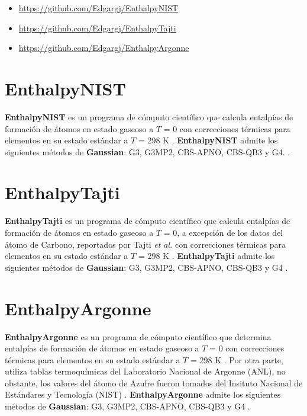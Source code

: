 \begin{itemize}

	\item \url{https://github.com/Edgargj/EnthalpyNIST}\\
	\item \url{https://github.com/Edgargj/EnthalpyTajti}\\
	\item \url{https://github.com/Edgargj/EnthalpyArgonne}\\

\end{itemize}

\newpage

\section{EnthalpyNIST}

\textbf{EnthalpyNIST} es un programa de cómputo científico que calcula entalpías de formación de átomos en estado gaseoso a  $T$ = 0 con correcciones térmicas para elementos en su estado estándar a $T$ = 298 K \cite{NIST1998,Nicolaides1996,McQuarrie1976}. \textbf{EnthalpyNIST} admite los siguientes métodos de \textbf{Gaussian}: G3, G3MP2, CBS-APNO, CBS-QB3 y G4. \cite{Simmie2015}.

\section{EnthalpyTajti}

\textbf{EnthalpyTajti} es un programa de cómputo científico que calcula entalpías de formación de átomos en estado gaseoso a  $T$ = 0, a excepción de los datos del átomo de Carbono, reportados por Tajti \textit{et al.} \cite{Tajti2004} con correcciones térmicas para elementos en su estado estándar a $T$ = 298 K \cite{NIST1998,Nicolaides1996,McQuarrie1976}. \textbf{EnthalpyTajti} admite los siguientes métodos de \textbf{Gaussian}: G3, G3MP2, CBS-APNO, CBS-QB3 y G4 \cite{Simmie2015}.

\section{EnthalpyArgonne}

\textbf{EnthalpyArgonne} es un programa de cómputo científico que determina entalpías de formación de átomos en estado gaseoso a $T$ = 0 con correcciones térmicas para elementos en su estado estándar a $T$ = 298 K \cite{Nicolaides1996,McQuarrie1976}. Por otra parte, utiliza tablas termoquímicas del Laboratorio Nacional de Argonne (ANL), no obstante, los valores del átomo de Azufre fueron tomados del Insituto Nacional de Estándares y Tecnología (NIST) \cite{NIST1998}. \textbf{EnthalpyArgonne }admite los siguientes métodos de \textbf{Gaussian}: G3, G3MP2, CBS-APNO, CBS-QB3 y G4 \cite{Simmie2015}.
